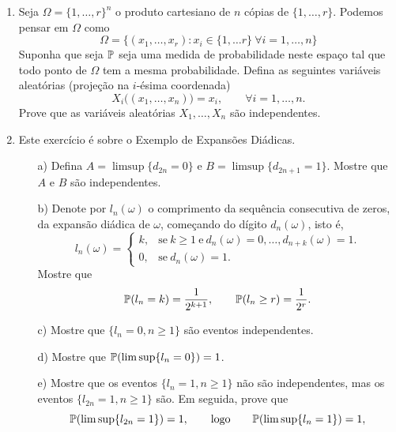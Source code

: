 \begin{enumerate}[leftmargin=*]
\item 
Seja $\Omega =\{1,\ldots, r\}^n$ o produto cartesiano de 
$n$ cópias de $\{1,\ldots, r\}$. 
Podemos pensar em $\Omega$ como 
	\[
		\Omega 
		=
		\{(x_1,\ldots,x_r): x_i\in\{1,\ldots r\}\ \forall i=1,\ldots,n\}
	\]
 Suponha que seja $\P$ seja
uma medida de probabilidade neste espaço tal que todo ponto 
de $\Omega$ tem a mesma probabilidade. 
Defina as seguintes variáveis aleatórias 
(projeção na $i$-ésima coordenada)
	\[
		X_i\Big((x_1,\ldots,x_n) \Big) = x_i,
		\qquad
		\forall i=1,\ldots,n.
	\]
Prove que as variáveis aleatórias $X_1,\ldots,X_n$
são independentes.




























\item Este exercício é sobre o Exemplo de Expansões Diádicas.
	\begin{itemize}
	\item[a)]
	Defina $A=\limsup \{d_{2n}=0 \}$ e $B=\limsup\{d_{2n+1}=1\}$.
	Mostre que $A$ e $B$ são independentes.
	
	\item[b)] 
	Denote por $l_n(\omega)$ o comprimento da sequência consecutiva
	de zeros, da expansão diádica de $\omega$, 
	começando do dígito $d_n(\omega)$, isto é,
		\[
			l_n(\omega)
			=
			\begin{cases}
				k,&\text{se}\ k\geq 1 \ \text{e}\ 
					d_n(\omega)=0,\ldots,d_{n+k}(\omega)=1.
				\\
				0,&\text{se} \ d_n(\omega)=1.
			\end{cases}
		\]
	Mostre que 
		\[
			\P(l_n=k) =\frac{1}{2^{k+1}},
			\qquad
			\P(l_n\geq r) = \frac{1}{2^r}.
		\]
		
	\item[c)] 
	Mostre que $\{l_n=0,n\geq 1\}$ são eventos independentes.
	
	\item[d)] 
	Mostre que $\P(\limsup \{l_n=0\})=1$.
	
	\item[e)]
	Mostre que os eventos $\{l_n=1, n\geq 1\}$ não são 
	independentes, mas os eventos $\{l_{2n}=1, n\geq 1\}$
	são. Em seguida, prove que  
		\[
			\P(\limsup \{l_{2n}=1\}) =1,
			\qquad
			\text{logo}
			\qquad
			\P(\limsup \{l_{n}=1\}) =1,		
		\]
	

\end{itemize}
\end{enumerate}
